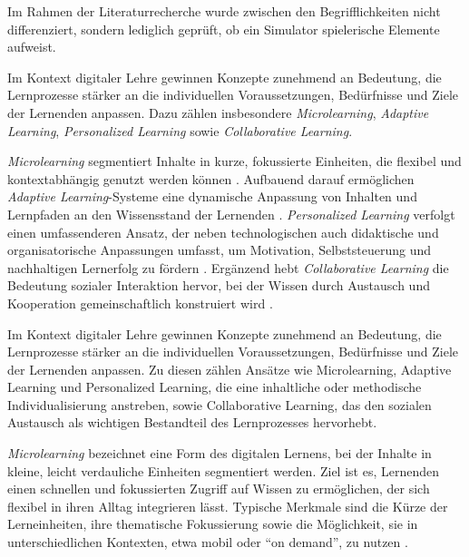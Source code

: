 Im Rahmen der Literaturrecherche wurde zwischen den Begrifflichkeiten nicht differenziert, sondern lediglich geprüft, ob ein Simulator spielerische Elemente aufweist.

Im Kontext digitaler Lehre gewinnen Konzepte zunehmend an Bedeutung, die Lernprozesse stärker an die individuellen Voraussetzungen, Bedürfnisse und Ziele der Lernenden anpassen. Dazu zählen insbesondere \textit{Microlearning}, \textit{Adaptive Learning}, \textit{Personalized Learning} sowie \textit{Collaborative Learning}. 

\textit{Microlearning} segmentiert Inhalte in kurze, fokussierte Einheiten, die flexibel und kontextabhängig genutzt werden können \parencite[S.~74]{chong_mvr-cls_2022}. Aufbauend darauf ermöglichen \textit{Adaptive Learning}-Systeme eine dynamische Anpassung von Inhalten und Lernpfaden an den Wissensstand der Lernenden \parencite[S.~448]{zhao_research_2019}. \textit{Personalized Learning} verfolgt einen umfassenderen Ansatz, der neben technologischen auch didaktische und organisatorische Anpassungen umfasst, um Motivation, Selbststeuerung und nachhaltigen Lernerfolg zu fördern \parencites[S.~6ff]{pane_informing_2017}[S.~2f]{gunawardena_personalized_2024}[S.~236--239]{walkington_appraising_2020}. Ergänzend hebt \textit{Collaborative Learning} die Bedeutung sozialer Interaktion hervor, bei der Wissen durch Austausch und Kooperation gemeinschaftlich konstruiert wird \parencite[S.~486]{laal_benefits_2021}.

\iffalse
Im Kontext digitaler Lehre gewinnen Konzepte zunehmend an Bedeutung, die Lernprozesse stärker an die individuellen Voraussetzungen, Bedürfnisse und Ziele der Lernenden anpassen. Zu diesen zählen Ansätze wie Microlearning, Adaptive Learning und Personalized Learning, die eine inhaltliche oder methodische Individualisierung anstreben, sowie Collaborative Learning, das den sozialen Austausch als wichtigen Bestandteil des Lernprozesses hervorhebt.

\textit{Microlearning} bezeichnet eine Form des digitalen Lernens, bei der Inhalte in kleine, leicht verdauliche Einheiten segmentiert werden. Ziel ist es, Lernenden einen schnellen und fokussierten Zugriff auf Wissen zu ermöglichen, der sich flexibel in ihren Alltag integrieren lässt. Typische Merkmale sind die Kürze der Lerneinheiten, ihre thematische Fokussierung sowie die Möglichkeit, sie in unterschiedlichen Kontexten, etwa mobil oder \enquote{on demand}, zu nutzen \parencite[S.~74]{chong_mvr-cls_2022}.

